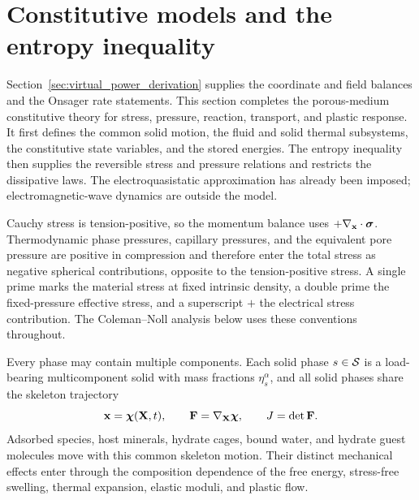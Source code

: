 \section{Constitutive models and the entropy inequality}
\label{sec:multicomponent_solid_skeletons}
\label{sec:multicomponent_solid_mixture_rules}
\label{sec:constitutive_models_entropy_inequality}

Section~\ref{sec:virtual_power_derivation} supplies the coordinate and field
balances and the Onsager rate statements.  This section completes the
porous-medium constitutive theory for stress, pressure, reaction, transport,
and plastic response.  It first defines the common solid motion, the fluid and
solid thermal subsystems, the constitutive state variables, and the stored
energies.  The entropy inequality then supplies the reversible stress and
pressure relations and restricts the dissipative laws.  The electroquasistatic
approximation has already been imposed; electromagnetic-wave dynamics are
outside the model.

Cauchy stress is tension-positive, so the momentum balance uses
\(+\nabla_{\mathbf{x}}\cdot\boldsymbol{\sigma}\).  Thermodynamic phase pressures, capillary
pressures, and the equivalent pore pressure are positive in compression and
therefore enter the total stress as negative spherical contributions, opposite
to the tension-positive stress.  A single prime marks the material stress at
fixed intrinsic density, a double prime the fixed-pressure effective stress, and a
superscript \(+\) the electrical stress contribution.  The Coleman--Noll
analysis below uses these conventions throughout.

Every phase may contain multiple components.  Each solid phase \(s\in\mathcal{S}\)
is a load-bearing multicomponent solid with mass fractions \(\eta_s^\alpha\),
and all solid phases share the skeleton trajectory
\begin{equation}
	\mathbf{x}=\boldsymbol{\chi}(\mathbf{X},t),
	\qquad
	\mathbf{F}=\nabla_{\mathbf{X}}\boldsymbol{\chi},
	\qquad
	J=\det\mathbf{F} .
	\label{eq:common_solid_skeleton_motion}
\end{equation}
Adsorbed species, host minerals, hydrate cages, bound water, and hydrate guest
molecules move with this common skeleton motion.  Their distinct mechanical
effects enter through the composition dependence of the free energy,
stress-free swelling, thermal expansion, elastic moduli, and plastic flow.

